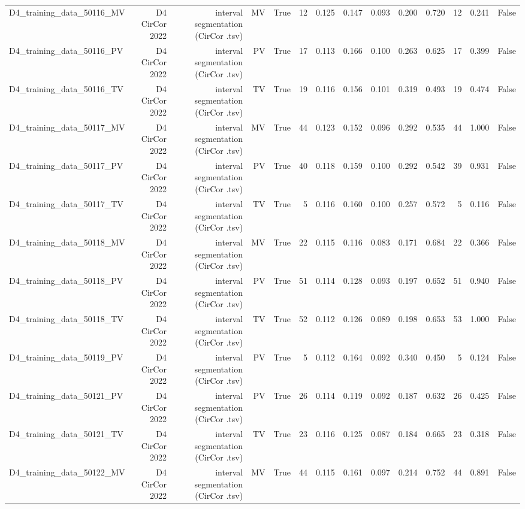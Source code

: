 \begin{table}[htbp]
\begin{tabular}{lrrrrrrrrrrrrr}
    D4\_training\_data\_50116\_MV & D4 CirCor 2022 & interval segmentation (CirCor .tsv) & MV & True & 12 & 0.125 & 0.147 & 0.093 & 0.200 & 0.720 & 12 & 0.241 & False \\
    D4\_training\_data\_50116\_PV & D4 CirCor 2022 & interval segmentation (CirCor .tsv) & PV & True & 17 & 0.113 & 0.166 & 0.100 & 0.263 & 0.625 & 17 & 0.399 & False \\
    D4\_training\_data\_50116\_TV & D4 CirCor 2022 & interval segmentation (CirCor .tsv) & TV & True & 19 & 0.116 & 0.156 & 0.101 & 0.319 & 0.493 & 19 & 0.474 & False \\
    D4\_training\_data\_50117\_MV & D4 CirCor 2022 & interval segmentation (CirCor .tsv) & MV & True & 44 & 0.123 & 0.152 & 0.096 & 0.292 & 0.535 & 44 & 1.000 & False \\
    D4\_training\_data\_50117\_PV & D4 CirCor 2022 & interval segmentation (CirCor .tsv) & PV & True & 40 & 0.118 & 0.159 & 0.100 & 0.292 & 0.542 & 39 & 0.931 & False \\
    D4\_training\_data\_50117\_TV & D4 CirCor 2022 & interval segmentation (CirCor .tsv) & TV & True & 5 & 0.116 & 0.160 & 0.100 & 0.257 & 0.572 & 5 & 0.116 & False \\
    D4\_training\_data\_50118\_MV & D4 CirCor 2022 & interval segmentation (CirCor .tsv) & MV & True & 22 & 0.115 & 0.116 & 0.083 & 0.171 & 0.684 & 22 & 0.366 & False \\
    D4\_training\_data\_50118\_PV & D4 CirCor 2022 & interval segmentation (CirCor .tsv) & PV & True & 51 & 0.114 & 0.128 & 0.093 & 0.197 & 0.652 & 51 & 0.940 & False \\
    D4\_training\_data\_50118\_TV & D4 CirCor 2022 & interval segmentation (CirCor .tsv) & TV & True & 52 & 0.112 & 0.126 & 0.089 & 0.198 & 0.653 & 53 & 1.000 & False \\
    D4\_training\_data\_50119\_PV & D4 CirCor 2022 & interval segmentation (CirCor .tsv) & PV & True & 5 & 0.112 & 0.164 & 0.092 & 0.340 & 0.450 & 5 & 0.124 & False \\
    D4\_training\_data\_50121\_PV & D4 CirCor 2022 & interval segmentation (CirCor .tsv) & PV & True & 26 & 0.114 & 0.119 & 0.092 & 0.187 & 0.632 & 26 & 0.425 & False \\
    D4\_training\_data\_50121\_TV & D4 CirCor 2022 & interval segmentation (CirCor .tsv) & TV & True & 23 & 0.116 & 0.125 & 0.087 & 0.184 & 0.665 & 23 & 0.318 & False \\
    D4\_training\_data\_50122\_MV & D4 CirCor 2022 & interval segmentation (CirCor .tsv) & MV & True & 44 & 0.115 & 0.161 & 0.097 & 0.214 & 0.752 & 44 & 0.891 & False \\

\end{tabular}
\end{table}
